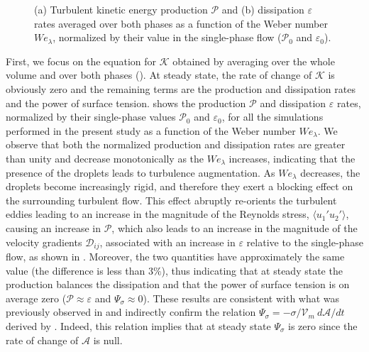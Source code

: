 \begin{figure}
	\centering
	 \hspace{0.5cm}
	 \vspace{0.5cm}
	\caption{(a) Turbulent kinetic energy production $\mathcal{P}$ and (b) dissipation $\varepsilon$ rates averaged over both phases as a function of the Weber number $We_\lambda$, normalized by their value in the single-phase flow ($\mathcal{P}_0$ and $\varepsilon_0$).}
	\label{fig:tke}
\end{figure}
First, we focus on the equation for $\mathcal{K}$ obtained by averaging over the whole volume and over both phases (). At steady state, the rate of change of $\mathcal{K}$ is obviously zero and the remaining terms are the production and dissipation rates and the power of surface tension.  shows the production $\mathcal{P}$ and dissipation $\varepsilon$ rates, normalized by their single-phase values $\mathcal{P}_0$ and $\varepsilon_0$, for all the simulations performed in the present study as a function of the Weber number $We_\lambda$. We observe that both the normalized production and dissipation rates are greater than unity and decrease monotonically as the $We_\lambda$ increases, indicating that the presence of the droplets leads to turbulence augmentation. As $We_\lambda$ decreases, the droplets become increasingly rigid, and therefore they exert a blocking effect on the surrounding turbulent flow. This effect abruptly re-orients the turbulent eddies leading to an increase in the magnitude of the Reynolds stress, $\langle u_1' u_2' \rangle$, causing an increase in $\mathcal{P}$, which also leads to an increase in the magnitude of the velocity gradients $\mathcal{D}_{ij}$, associated with an increase in $\varepsilon$ relative to the single-phase flow, as shown in . Moreover, the two quantities have approximately the same value (the difference is less than $3\%$), thus indicating that at steady state the production balances the dissipation and that the power of surface tension is on average zero (\ie $\mathcal{P} \approx \varepsilon$ and $\Psi_\sigma \approx 0$). These results are consistent with what was previously observed in  and indirectly confirm the relation $\Psi_\sigma= - \sigma/\mathcal{V}_m~d\mathcal{A}/dt$ derived by \citet{dodd_ferrante_2016a}. Indeed, this relation implies that at steady state $\Psi_\sigma$ is zero since the rate of change of $\mathcal{A}$ is null.

